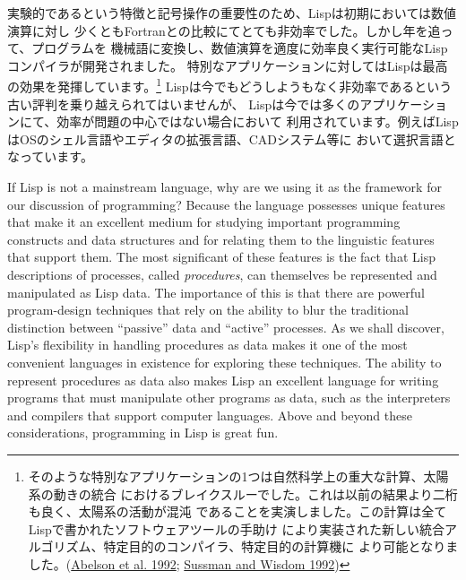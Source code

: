 \documentclass[8pt,oneside]{book}
\newcommand{\newterm}[1]{\index{#1}\emph{#1}}
\newcommand{\link}[1]{\hyperref[#1]{#1}}
\begin{document}
実験的であるという特徴と記号操作の重要性のため、Lispは初期においては数値演算に対し
少くともFortranとの比較にてとても非効率でした。しかし年を追って、プログラムを
機械語に変換し、数値演算を適度に効率良く実行可能なLispコンパイラが開発されました。
特別なアプリケーションに対してはLispは最高の効果を発揮しています。\footnote{
そのような特別なアプリケーションの1つは自然科学上の重大な計算、太陽系の動きの統合
におけるブレイクスルーでした。これは以前の結果より二桁も良く、太陽系の活動が混沌
であることを実演しました。この計算は全てLispで書かれたソフトウェアツールの手助け
により実装された新しい統合アルゴリズム、特定目的のコンパイラ、特定目的の計算機に
より可能となりました。(\link{Abelson et al. 1992}; \link{Sussman and Wisdom 1992})}
Lispは今でもどうしようもなく非効率であるという古い評判を乗り越えられてはいませんが、
Lispは今では多くのアプリケーションにて、効率が問題の中心ではない場合において
利用されています。例えばLispはOSのシェル言語やエディタの拡張言語、CADシステム等に
おいて選択言語となっています。

If Lisp is not a mainstream language, why are we using it as the framework for
our discussion of programming?  Because the language possesses unique features
that make it an excellent medium for studying important programming constructs
and data structures and for relating them to the linguistic features that
support them.  The most significant of these features is the fact that Lisp
descriptions of processes, called \newterm{procedures}, can themselves be
represented and manipulated as Lisp data.  The importance of this is that there
are powerful program-design techniques that rely on the ability to blur the
traditional distinction between ``passive'' data and ``active'' processes.  As
we shall discover, Lisp's flexibility in handling procedures as data makes it
one of the most convenient languages in existence for exploring these
techniques.  The ability to represent procedures as data also makes Lisp an
excellent language for writing programs that must manipulate other programs as
data, such as the interpreters and compilers that support computer languages.
Above and beyond these considerations, programming in Lisp is great fun.
\end{document}
